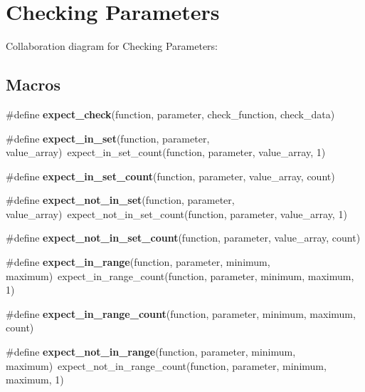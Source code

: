 \hypertarget{group__cmocka__param}{}\section{Checking Parameters}
\label{group__cmocka__param}
Collaboration diagram for Checking Parameters\+:
\subsection*{Macros}
\begin{DoxyCompactItemize}
\item 
\#define {\bfseries expect\+\_\+check}(function,  parameter,  check\+\_\+function,  check\+\_\+data)
\item 
\mbox{\label{group__cmocka__param_ga91562e46f74db06f30cff32b0c135511}} 
\#define {\bfseries expect\+\_\+in\+\_\+set}(function,  parameter,  value\+\_\+array)~expect\+\_\+in\+\_\+set\+\_\+count(function, parameter, value\+\_\+array, 1)
\item 
\#define {\bfseries expect\+\_\+in\+\_\+set\+\_\+count}(function,  parameter,  value\+\_\+array,  count)
\item 
\mbox{\label{group__cmocka__param_gafc6725e85858b591a02d0acaf591a9c1}} 
\#define {\bfseries expect\+\_\+not\+\_\+in\+\_\+set}(function,  parameter,  value\+\_\+array)~expect\+\_\+not\+\_\+in\+\_\+set\+\_\+count(function, parameter, value\+\_\+array, 1)
\item 
\#define {\bfseries expect\+\_\+not\+\_\+in\+\_\+set\+\_\+count}(function,  parameter,  value\+\_\+array,  count)
\item 
\mbox{\label{group__cmocka__param_ga70af2c4899fb6bfad0b84b7c9aa3f041}} 
\#define {\bfseries expect\+\_\+in\+\_\+range}(function,  parameter,  minimum,  maximum)~expect\+\_\+in\+\_\+range\+\_\+count(function, parameter, minimum, maximum, 1)
\item 
\#define {\bfseries expect\+\_\+in\+\_\+range\+\_\+count}(function,  parameter,  minimum,  maximum,  count)
\item 
\mbox{\label{group__cmocka__param_ga98129ce6a55f668a788bd851762fb4c6}} 
\#define {\bfseries expect\+\_\+not\+\_\+in\+\_\+range}(function,  parameter,  minimum,  maximum)~expect\+\_\+not\+\_\+in\+\_\+range\+\_\+count(function, parameter, minimum, maximum, 1)

\end{DoxyCompactItemize}
